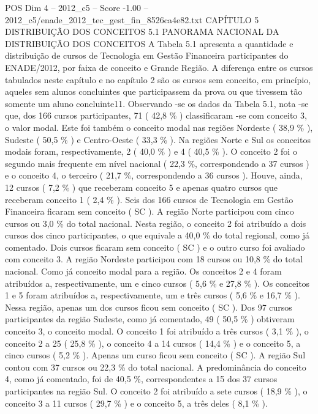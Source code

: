 \begin{textsample}{POS Dim 4 – 2012\_c5 – Score -1.00 – 2012\_c5/enade\_2012\_tec\_gest\_fin\_8526ca4e82.txt}  \label{ex:f4_pos_254}
CAPÍTULO 5 DISTRIBUIÇÃO DOS CONCEITOS 5.1 PANORAMA NACIONAL DA DISTRIBUIÇÃO DOS CONCEITOS A Tabela 5.1 apresenta a quantidade e distribuição de cursos de Tecnologia em Gestão Financeira participantes do ENADE/2012, por faixa de conceito e Grande Região.
A diferença entre os cursos tabulados neste capítulo e no capítulo 2 são os cursos sem conceito, em princípio, aqueles sem alunos concluintes que participassem da prova ou que tivessem tão somente um aluno concluinte11.
Observando -se os dados da Tabela 5.1, nota -se que, dos 166 cursos participantes, 71 ( 42,8 \% ) classificaram -se com conceito 3, o valor modal.
Este foi também o conceito modal nas regiões Nordeste ( 38,9 \% ), Sudeste ( 50,5 \% ) e Centro-Oeste ( 33,3 \% ).
Na regiões Norte e Sul os conceitos modais foram, respectivamente, 2 ( 40,0 \% ) e 4 ( 40,5 \% ).
O conceito 2 foi o segundo mais frequente em nível nacional ( 22,3 \%, correspondendo a 37 cursos ) e o conceito 4, o terceiro ( 21,7 \%, correspondendo a 36 cursos ).
Houve, ainda, 12 cursos ( 7,2 \% ) que receberam conceito 5 e apenas quatro cursos que receberam conceito 1 ( 2,4 \% ).
Seis dos 166 cursos de Tecnologia em Gestão Financeira ficaram sem conceito ( SC ).
A região Norte participou com cinco cursos ou 3,0 \% do total nacional.
Nesta região, o conceito 2 foi atribuído a dois cursos dos cinco participantes, o que equivale a 40,0 \% do total regional, como já comentado.
Dois cursos ficaram sem conceito ( SC ) e o outro curso foi avaliado com conceito 3.
A região Nordeste participou com 18 cursos ou 10,8 \% do total nacional.
Como já conceito modal para a região.
Os conceitos 2 e 4 foram atribuídos a, respectivamente, um e cinco cursos ( 5,6 \% e 27,8 \% ).
Os conceitos 1 e 5 foram atribuídos a, respectivamente, um e três cursos ( 5,6 \% e 16,7 \% ).
Nessa região, apenas um dos cursos ficou sem conceito ( SC ).
Dos 97 cursos participantes da região Sudeste, como já comentado, 49 ( 50,5 \% ) obtiveram conceito 3, o conceito modal.
O conceito 1 foi atribuído a três cursos ( 3,1 \% ), o conceito 2 a 25 ( 25,8 \% ), o conceito 4 a 14 cursos ( 14,4 \% ) e o conceito 5, a cinco cursos ( 5,2 \% ).
Apenas um curso ficou sem conceito ( SC ).
A região Sul contou com 37 cursos ou 22,3 \% do total nacional.
A predominância do conceito 4, como já comentado, foi de 40,5 \%, correspondentes a 15 dos 37 cursos participantes na região Sul.
O conceito 2 foi atribuído a sete cursos ( 18,9 \% ), o conceito 3 a 11 cursos ( 29,7 \% ) e o conceito 5, a três deles ( 8,1 \% ).

\end{textsample}
